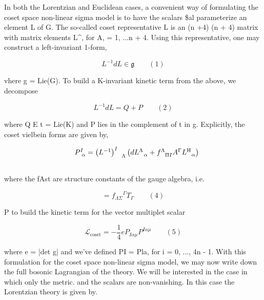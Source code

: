 \documentclass{article}
\begin{document}
\sloppy

In both the Lorentzian and Euclidean cases, a convenient way of formulating the coset
space non-linear sigma model is to have the scalars \$al parameterize an element L of G.
The so-called coset representative L is an (n +4)  (n + 4) matrix with matrix elements L\textasciicircum{},
for A,  = 1, ...n + 4. Using this representative, one may construct a left-invariant 1-form,


\begin{equation}
L ^ { - 1 } d L \in \mathfrak { g } \qquad ( 1 )
\end{equation}


vhere g = Lie(G). To build a K-invariant kinetic term from the above, we decompose


\begin{equation}
L ^ { - 1 } d L = Q + P \qquad ( 2 )
\end{equation}


where Q E t = Lie(K) and P lies in the complement of t in g. Explicitly, the coset vielbein
forms are given by,


\begin{equation}
\begin{array} { r l } & { P _ { ~ \alpha } ^ { I } = \left ( L ^ { - 1 } \right ) _ { ~ ~ ~ \Lambda } ^ { I } \left ( d L _ { ~ ~ \alpha } ^ { \Lambda } + f _ { ~ ~ \Pi I } ^ { \Lambda } A ^ { \Gamma } L _ { ~ ~ \alpha } ^ { \mathrm { H } } \right ) } \\ & { \qquad }\end{array}
\end{equation}


where the fAst are structure constants of the gauge algebra, i.e.


\begin{equation}
[ T _ { \Lambda }, T _ { \Sigma } ] = { f _ { \Lambda \Sigma } } ^ { \Gamma } T _ { \Gamma } \qquad ( 4 )
\end{equation}


P to build the kinetic term for the vector multiplet scalar


\begin{equation}
\mathcal { L } _ { \mathrm { c o s e t } } = - \frac { 1 } { 4 } e P _ { I \alpha \mu } P ^ { I \alpha \mu } \qquad ( 5 )
\end{equation}


where e = |det g| and we've defined PI = Pla, for i = 0, ..., 4n - 1. With this
formulation for the coset space non-linear sigma model, we may now write down the full
bosonic Lagrangian of the theory. We will be interested in the case in which only the metric.
and the scalars are non-vanishing. In this case the Lorentzian theory is given by.
\end{document}
